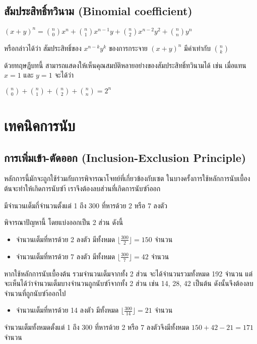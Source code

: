 \subsection{สัมประสิทธิ์ทวินาม (Binomial coefficient)}
\begin{theorem}
$(x+y)^n = \binom{n}{0}x^n + \binom{n}{1}x^{n-1}y + \binom{n}{2}x^{n-2}y^2 + \binom{n}{n}y^n$
\end{theorem}
หรือกล่าวได้ว่า สัมประสิทธิ์ของ $x^{n-k}y^{k}$ ของการกระจาย $(x+y)^n$ มีค่าเท่ากับ $\binom{n}{k}$

ด้วยทฤษฎีบทนี้ สามารถแสดงให้เห็นคุณสมบัติหลายอย่างของสัมประสิทธิ์ทวินามได้ เช่น เมื่อแทน $x=1$ และ $y=1$ จะได้ว่า
\begin{center}
$\binom{n}{0} + \binom{n}{1} + \binom{n}{2} + \binom{n}{n} = 2^n$
\end{center}

\section{เทคนิคการนับ}
\subsection{การเพิ่มเข้า-ตัดออก (Inclusion-Exclusion Principle)}

หลักการนี้มักจะถูกใช้ร่วมกับการพิจารณาโจทย์ที่เกี่ยวข้องกับเซต ในบางครั้งการใช้หลักการนับเบื้องต้นจะทำให้เกิดการนับซำ้ เราจึงต้องลบส่วนที่เกิดการนับซำ้ออก

\begin{example}
มีจำนวนเต็มกี่จำนวนตั้งแต่ 1 ถึง 300 ที่หารด้วย 2 หรือ 7 ลงตัว

พิจารณาปัญหานี้ โดยแบ่งออกเป็น 2 ส่วน ดังนี้
\begin{itemize}
\item จำนวนเต็มที่หารด้วย 2 ลงตัว มีทั้งหมด $\lfloor \frac{300}{2} \rfloor = 150$ จำนวน
\item จำนวนเต็มที่หารด้วย 7 ลงตัว มีทั้งหมด $\lfloor \frac{300}{7} \rfloor = 42$ จำนวน
\end{itemize}

หากใช้หลักการนับเบื้องต้น รวมจำนวนเต็มจากทั้ง 2 ส่วน จะได้จำนวนรวมทั้งหมด 192 จำนวน แต่จะเห็นได้ว่าจำนวนเต็มบางจำนวนถูกนับซำ้จากทั้ง 2 ส่วน เช่น 14, 28, 42 เป็นต้น ดังนั้นจึงต้องลบจำนวนที่ถูกนับซำ้ออกไป
\begin{itemize}
\item จำนวนเต็มที่หารด้วย 14 ลงตัว มีทั้งหมด $\lfloor \frac{300}{14} \rfloor = 21$ จำนวน
\end{itemize}
จำนวนเต็มทั้งหมดตั้งแต่ 1 ถึง 300 ที่หารด้วย 2 หรือ 7 ลงตัวจึงมีทั้งหมด $150+42-21=171$ จำนวน
\end{example}

